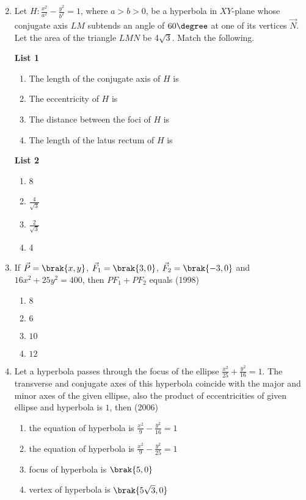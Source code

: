 \begin{enumerate}
\begin{multicols}{2}
\begin{enumerate}
\end{enumerate}
\end{multicols}


 \item Let $H : \frac{x^2}{a^2}-\frac{y^2}{b^2}= 1$, where $a>b>0$, be a hyperbola in $XY$-plane whose conjugate axis $LM$ subtends an angle of $60\degree$ at one of its vertices $\vec{N}$. Let the area of the triangle $LMN$ be 4$\sqrt{3}$.
Match the following.
\begin{multicols}{2}
\textbf{List 1}
\begin{enumerate}
    \item The length of the conjugate axis of $H$ is
    \item The eccentricity of $H$ is
    \item The distance between the foci of $H$ is
    \item The length of the latus rectum of $H$ is
\end{enumerate}
\columnbreak
\textbf{List 2}
\begin{enumerate}
    \item 8
    \item $\frac{4}{\sqrt{3}}$
    \item $\frac{2}{\sqrt{3}}$
    \item 4
\end{enumerate}
\end{multicols}
\item If $\vec{P}=\brak{x,y}$, $\vec{F}_{1}=\brak{3,0}$, $\vec{F}_{2}=\brak{-3,0}$ and $16x^2+25y^2=400$, then ${PF}_{1}+{PF}_{2}$ equals \hfill(1998)
	\begin{multicols}{4}
	\begin{enumerate}
		\item $8$
		\item $6$
		\item $10$
		\item $12$
	\end{enumerate}\end{multicols}

\item Let a hyperbola passes through the focus of the ellipse $\frac{x^2}{25}+\frac{y^2}{16}=1$. The transverse and conjugate axes of this hyperbola coincide with the major and minor axes of the given ellipse, also the product of eccentricities of given ellipse and hyperbola is $1$, then \hfill (2006)
	\begin{multicols}{2}
	\begin{enumerate}
		\item the equation of hyperbola is $\frac{x^2}{9}-\frac{y^2}{16}=1$
		\item the equation of hyperbola is $\frac{x^2}{9}-\frac{y^2}{25}=1$
		\item focus of hyperbola is $\brak{5,0}$
		\item vertex of hyperbola is $\brak{5\sqrt{3},0}$
	\end{enumerate}\end{multicols}


\end{enumerate}
